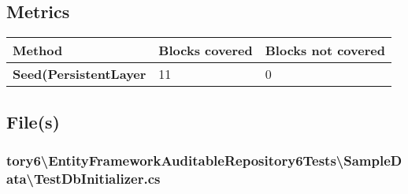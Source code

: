 \documentclass[a4paper,10pt]{article}
\begin{document}
\subsection{Metrics}
\begin{longtable}[l]{|l|l|l|}
\hline
\textbf{Method} & \textbf{Blocks covered} & \textbf{Blocks not covered}\\
\hline
\textbf{Seed(PersistentLayer} & 11 & 0\\
\hline
\end{longtable}
\subsection{File(s)}
\subsubsection{tory6\textbackslash EntityFrameworkAuditableRepository6Tests\textbackslash SampleData\textbackslash TestDbInitializer.cs}
\end{document}
